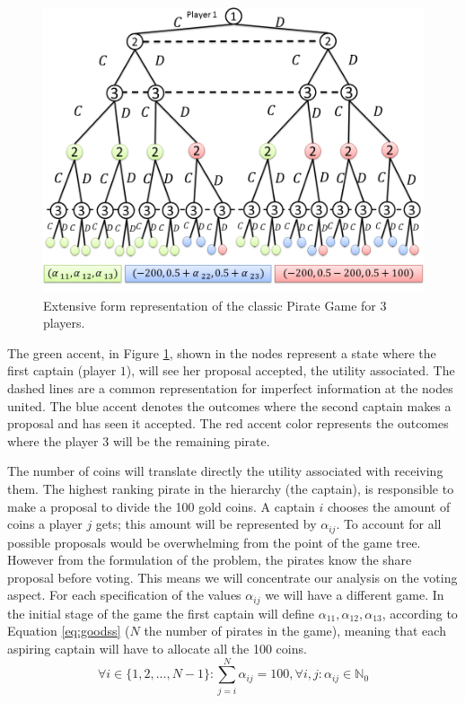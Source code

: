 \documentclass[10pt]{llncs}
\begin{document}
\begin{figure}[h]
\centering 
\includegraphics[scale=0.28]{Figures/1.5qubit/FigurasRevistas/Slide1.png}
\caption{Extensive form representation of the classic Pirate Game for $3$ players. }
\label{fig:pg_architecturegametree:extensiveform}
\end{figure}

The green accent, in Figure \ref{fig:pg_architecturegametree:extensiveform}, shown in the nodes represent a state where the first captain (player $1$), will see her proposal accepted, the utility associated. The dashed lines are a common representation for imperfect information  at the nodes united. The blue accent denotes the outcomes where the second captain makes a proposal and has seen it accepted. The red accent color represents the outcomes where the player $3$ will be the remaining pirate.

The number of coins will translate directly the utility associated with receiving them. The highest ranking pirate in the hierarchy (the captain), is responsible to make a proposal to divide the 100 gold coins. A captain $i$ chooses the amount of coins a player $j$ gets; this amount will be represented by $\alpha_{ij}$. 
To account for all possible proposals would be overwhelming from the point of the game tree. However from the formulation of the problem, the pirates know the share proposal before voting. This means we will concentrate our analysis on the voting aspect. For each specification of the values $\alpha_{ij}$ we will have a different game. 
In the initial stage of the game the first captain will define $\alpha_{11}, \alpha_{12}, \alpha_{13}$, according to Equation \ref{eq:goodss} ($N$ the number of pirates in the game), meaning that each aspiring captain will have to allocate all the 100 coins. 
\begin{equation}
\label{eq:goodss}
\forall i \in \{1 , 2, ..., N-1\} : \sum_{j=i}^{N}\alpha_{ij}=100, \forall i,j :\alpha_{ij}\in\mathbb{N}_{0}
\end{equation}
\end{document}
